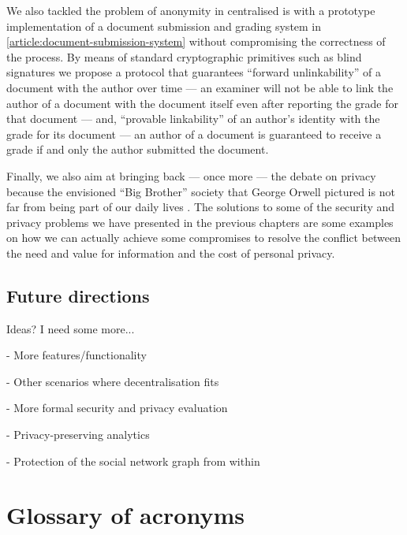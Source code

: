 \documentclass[showtrims, oldfontcommands]{kthesis}
\begin{document}
We also tackled the problem of anonymity in centralised \ac{is} with a prototype 
implementation of a document submission and grading system in \cref{article:document-submission-system} 
without compromising the correctness of the process. By means of standard cryptographic 
primitives such as blind signatures we propose a protocol that guarantees ``forward 
unlinkability'' of a document with the author over time --- an examiner will not 
be able to link the author of a document with the document itself even after reporting 
the grade for that document --- and, ``provable linkability'' of an author's identity 
with the grade for its document --- an author of a document is guaranteed to receive 
a grade if and only the author submitted the document.

Finally, we also aim at bringing back --- once more --- the debate on privacy because 
the envisioned ``Big Brother'' society that George Orwell pictured is not far from 
being part of our daily lives \cite{Orwell49}. The solutions to some of the security 
and privacy problems we have presented in the previous chapters are some examples on 
how we can actually achieve some compromises to resolve the conflict between the 
need and value for information and the cost of personal privacy.

\section{Future directions}
    \label{section:future-directions}
Ideas? I need some more...

- More features/functionality

- Other scenarios where decentralisation fits

- More formal security and privacy evaluation

- Privacy-preserving analytics

- Protection of the social network graph from within


\chapter{Glossary of acronyms}
\end{document}
